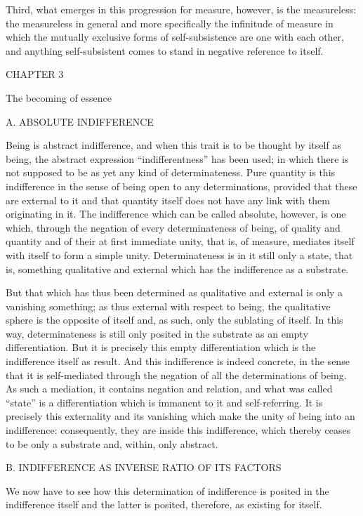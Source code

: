 Third, what emerges in this progression for measure, however,
is the measureless:
the measureless in general and more specifically
the infinitude of measure in which the mutually exclusive
forms of self-subsistence are one with each other,
and anything self-subsistent comes to stand
in negative reference to itself.

CHAPTER 3

The becoming of essence

A. ABSOLUTE INDIFFERENCE

Being is abstract indifference,
and when this trait is to be thought by itself as being,
the abstract expression “indifferentness” has been used;
in which there is not supposed to be as yet
any kind of determinateness.
Pure quantity is this indifference in the sense of
being open to any determinations,
provided that these are external to it
and that quantity itself does not have
any link with them originating in it.
The indifference which can be called absolute,
however, is one which, through the negation of
every determinateness of being, of quality and quantity
and of their at first immediate unity, that is, of measure,
mediates itself with itself to form a simple unity.
Determinateness is in it still only a state, that is,
something qualitative and external
which has the indifference as a substrate.

But that which has thus been determined
as qualitative and external
is only a vanishing something;
as thus external with respect to being,
the qualitative sphere is the opposite of itself
and, as such, only the sublating of itself.
In this way, determinateness is still
only posited in the substrate
as an empty differentiation.
But it is precisely this empty differentiation
which is the indifference itself as result.
And this indifference is indeed concrete,
in the sense that it is self-mediated
through the negation of all the determinations of being.
As such a mediation, it contains negation and relation,
and what was called “state” is a differentiation
which is immanent to it and self-referring.
It is precisely this externality and its vanishing
which make the unity of being into an indifference:
consequently, they are inside this indifference,
which thereby ceases to be only a substrate
and, within, only abstract.

B. INDIFFERENCE AS INVERSE RATIO OF ITS FACTORS

We now have to see how this determination
of indifference is posited in the indifference itself
and the latter is posited, therefore, as existing for itself.

